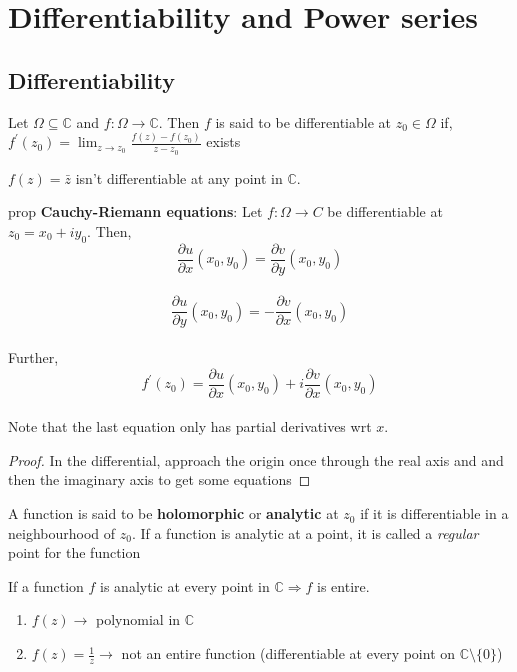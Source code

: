 \chapter{Differentiability and Power series}
\section{\textbf{Differentiability}} 
\begin{defn}
Let $\Omega \subseteq \mathds{C}$ and $f: \Omega \rightarrow \mathds{C}$. Then $f$ is said to be differentiable at $z_0\in \Omega$ if,\\
$f^{'}(z_0)= \lim_{z \to z_0} \frac{f(z)-f(z_0)}{z-z_0}$ exists 
\end{defn}
\begin{ex}
$f(z)=\bar{z}$ isn't differentiable at any point in $\mathds{C}$.
\end{ex}
\begin{restatable}[]{prop}{}\label{}
\textbf{Cauchy-Riemann equations}: Let $f:\Omega \rightarrow C$ be differentiable at $z_0=x_0+iy_0$. Then,\\
$$\frac{\partial u}{\partial x}(x_0,y_0)=\frac{\partial v}{\partial y}(x_0,y_0)$$\\
$$\frac{\partial u}{\partial y}(x_0,y_0)= -\frac{\partial v}{\partial x}(x_0,y_0)$$\\
Further, $$f^{'}(z_0)= \frac{\partial u}{\partial x}(x_0,y_0)+i\frac{\partial v}{\partial x}(x_0,y_0)$$\\
Note that the last equation only has partial derivatives wrt $x$.
\end{restatable}
\begin{proof}
In the differential, approach the origin once through the real axis and and then the imaginary axis to get some equations  
\end{proof}
\begin{defn}
A function is said to be \textbf{holomorphic} or \textbf{analytic} at $z_0$ if it is differentiable in a neighbourhood of $z_0$. 
If a function is analytic at a point, it is called a \emph{regular} point for the function 
\end{defn}
\begin{defn}
If a function $f$ is analytic at every point in $\mathds{C}\Rightarrow f$ is entire.
\end{defn}
\begin{ex}
\begin{enumerate}
\item $f(z)\rightarrow$ polynomial in $\mathds{C}$ 
\item$f(z)=\frac{1}{z}\rightarrow$ not an entire function (differentiable at every point on $\mathds{C}\setminus \{0\}$)
\end{enumerate}
\end{ex}
